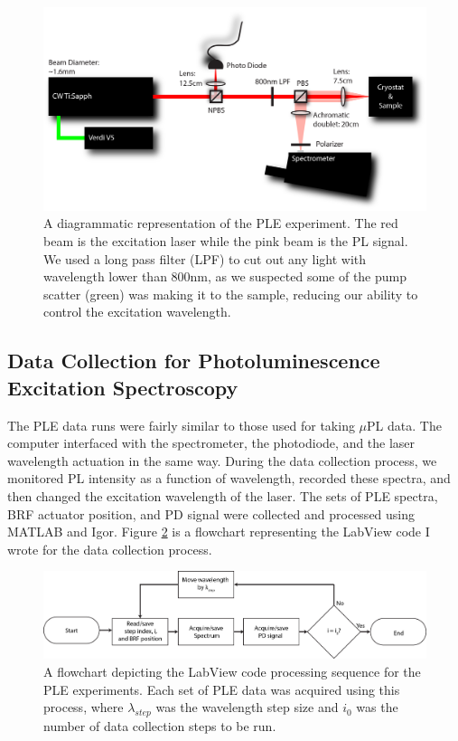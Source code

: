 \begin{figure}[h!]
\centering
\includegraphics[width = 1\textwidth]{PLE.png}
\caption{ \doublespacing A diagrammatic representation of the PLE experiment. The red beam is the excitation laser while the pink beam is the PL signal. We used a long pass filter (LPF) to cut out any light with wavelength lower than 800nm, as we suspected some of the pump scatter (green) was making it to the sample, reducing our ability to control the excitation wavelength.}
\label{PLE}
\end{figure}

\subsection{Data Collection for Photoluminescence Excitation Spectroscopy}
The PLE data runs were fairly similar to those used for taking $\mu$PL data. The computer interfaced with the spectrometer, the photodiode, and the laser wavelength actuation in the same way. During the data collection process, we monitored PL intensity as a function of wavelength, recorded these spectra, and then changed the excitation wavelength of the laser. The sets of PLE spectra, BRF actuator position, and PD signal were collected and processed using MATLAB and Igor. Figure \ref{flowitple} is a flowchart representing the LabView code I wrote for the data collection process.

\begin{figure}[h!]
\centering
\includegraphics[width = 1\textwidth]{pleSoftflow.png}
\caption{ \doublespacing A flowchart depicting the LabView code processing sequence for the PLE experiments. Each set of PLE data was acquired using this process, where $\lambda_{step}$ was the wavelength step size and $i_0$ was the number of data collection steps to be run.}
\label{flowitple}
\end{figure}

